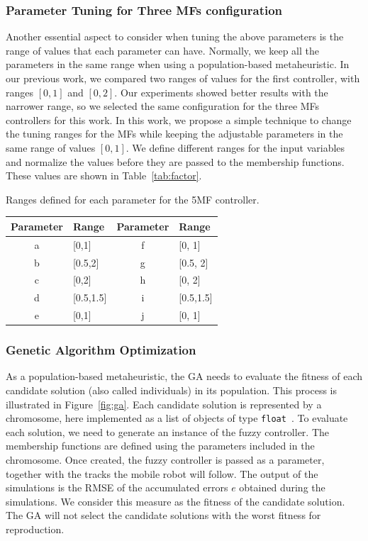 \documentclass[symmetry,article,submit,moreauthors,pdftex]{Definitions/mdpi}
\begin{document}
\subsubsection{ Parameter Tuning for Three MFs configuration}

Another essential aspect to consider when tuning the above parameters is the
range of values that each parameter can have. Normally, we keep all the
parameters in the same range when using a population-based metaheuristic. In
our previous work, we compared two ranges of values for the first controller,
with ranges $[0,1]$ and $[0,2]$. Our experiments showed better results with the
narrower range, so we selected the same configuration for the three MFs
controllers for this work. In this work, we propose a simple technique to
change the tuning ranges for the MFs while keeping the adjustable parameters in
the same range of values $[0,1]$. We define different ranges for the input
variables and normalize the values before they are passed to the membership
functions.  These values are shown in Table~\ref{tab:factor}.

\begin{specialtable}[H] 
\small
\caption{Ranges defined for each parameter for the 5MF controller.}\label{tab:factor}
\begin{tabular}{clcl}
\toprule
\textbf{Parameter}	& \textbf{Range}& \textbf{Parameter} & \textbf{Range}\\
\midrule
a & [0,1]			& f & [0, 1]\\
b & [0.5,2]			& g & [0.5, 2]\\
c & [0,2]			& h & [0, 2]\\
d & [0.5,1.5]		& i & [0.5,1.5]\\
e & [0,1]			& j & [0, 1]\\
\bottomrule
\end{tabular}
\end{specialtable}

\subsubsection{Genetic Algorithm Optimization}\label{sec:GAO}

As a population-based metaheuristic, the GA needs to evaluate the fitness of
each candidate solution (also called individuals) in its population. This
process is illustrated in Figure~\ref{fig:ga}. Each candidate solution is
represented by a chromosome, here implemented as a list of objects of type {
\tt float }. To evaluate each solution, we need to generate an instance of the
fuzzy controller. The membership functions are defined using the parameters
included in the chromosome. Once created, the fuzzy controller is passed as a
parameter, together with the tracks the mobile robot will follow. The output of
the simulations is the RMSE of the accumulated errors $e$  obtained during the
simulations. We consider this measure as the fitness of the candidate solution.
The GA will not select the candidate solutions with the worst fitness for
reproduction.
\end{document}
